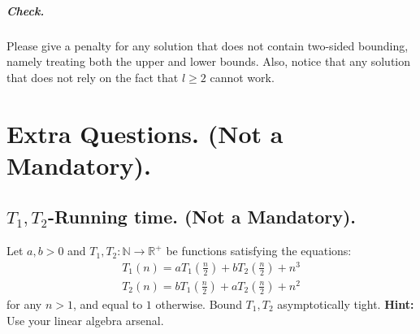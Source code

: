 \ifdefined\CHECK
  \paragraph{Check.} Please give a penalty for any solution that does not contain two-sided bounding, namely treating both the upper and lower bounds. Also, notice that any solution that does not rely on the fact that $l\ge 2$ cannot work. 
\fi


\fi
\chapter*{Extra Questions. (Not a Mandatory).}

\section{$T_{1},T_{2}$-Running time. (Not a Mandatory).}
Let $a,b>0$ and $T_{1},T_{2} : \mathbb{N} \rightarrow \mathbb{R}^{+}$ be functions satisfying the equations:
\begin{equation*}
  \begin{split}
    T_{1}\left( n \right) = aT_{1}\left(\frac{n}{2} \right) + bT_{2}\left(\frac{n}{2} \right) + n^{3}\\ 
    T_{2}\left( n \right) = bT_{1}\left(\frac{n}{2} \right) + aT_{2}\left(\frac{n}{2} \right) + n^{2} 
  \end{split}
\end{equation*}
for any $n>1$, and equal to $1$ otherwise. Bound $T_{1}, T_{2}$ asymptotically tight. \textbf{Hint:} Use your linear algebra arsenal.

\ifdefined\BOOK
\ifdefined\SOLUTION
